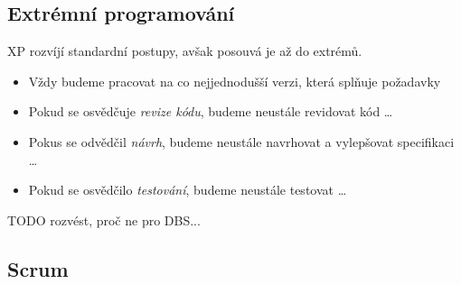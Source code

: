 \subsection{Extrémní programování}

XP rozvíjí standardní postupy, avšak posouvá je až do extrémů.
\begin{itemize}
	\item Vždy budeme pracovat na co nejjednodušší verzi, která splňuje požadavky
	\item Pokud se osvědčuje \emph{revize kódu}, budeme neustále revidovat kód \ldots
	\item Pokus se odvědčil \emph{návrh}, budeme neustále navrhovat a vylepšovat specifikaci \ldots
	\item Pokud se osvědčilo \emph{testování}, budeme neustále testovat \ldots
\end{itemize}
TODO rozvést, proč ne pro DBS...

\subsection{Scrum}
